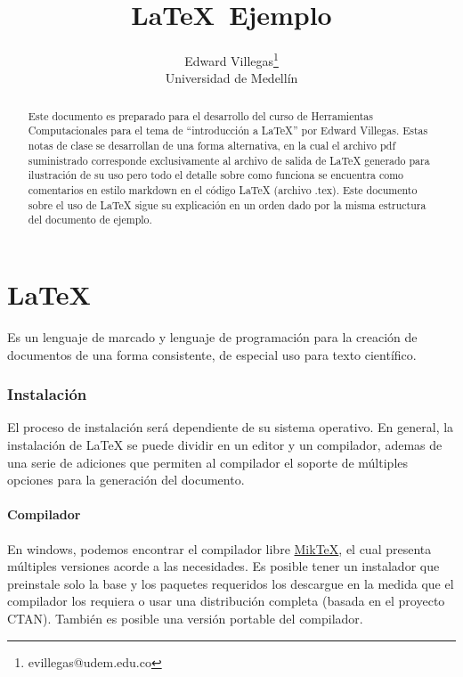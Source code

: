 \documentclass[12pt]{article}
\author{Edward Villegas\thanks{evillegas@udem.edu.co}\\Universidad de Medellín}
\title{\LaTeX \ Ejemplo}
\begin{document}
\maketitle

\begin{abstract}
Este documento es preparado para el desarrollo del curso de Herramientas Computacionales para el tema de ``introducción a LaTeX'' por Edward Villegas. Estas notas de clase se desarrollan de una forma alternativa, en la cual el archivo pdf suministrado corresponde exclusivamente al archivo de salida de LaTeX generado para ilustración de su uso pero todo el detalle sobre como funciona se encuentra como comentarios en estilo markdown en el código LaTeX (archivo .tex).
Este documento sobre el uso de LaTeX sigue su explicación en un orden dado por la misma estructura del documento de ejemplo.
\end{abstract}

\tableofcontents

\part{\LaTeX}
Es un lenguaje de marcado y lenguaje de programación para la creación de documentos de una forma consistente, de especial uso para texto científico.

\section{Instalación}

El proceso de instalación será dependiente de su sistema operativo. En general, la instalación de LaTeX se puede dividir en un editor y un compilador, ademas de una serie de adiciones que permiten al compilador el soporte de múltiples opciones para la generación del documento.

\subsection{Compilador}

En windows, podemos encontrar el compilador libre \href{http://miktex.org/}{MikTeX}, el cual presenta múltiples versiones acorde a las necesidades. Es posible tener un instalador que preinstale solo la base y los paquetes requeridos los descargue en la medida que el compilador los requiera o usar una distribución completa (basada en el proyecto CTAN). También es posible una versión portable del compilador.
\end{document}
